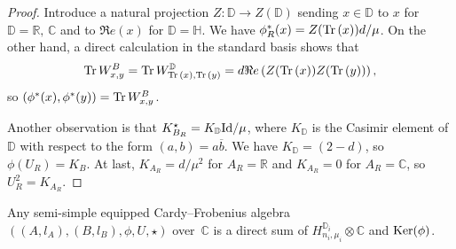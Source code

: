 \documentclass[pdftex]{sigma}
\newcommand{\tr}{\mathop{\sf tr}\nolimits}
\def \R {{\mathbb R}}
\def \C {{\mathbb C}}
\def \H {{\mathbb H}}
\def \tr {{\rm Tr}\,}
\def \id {{\rm Id}}
\def \re {{\Re e}}
\begin{document}
\begin{proof}
Introduce a natural projection $Z: {\mathbb D} \to Z({\mathbb D})$ sending
$x \in \mathbb D$ to $x$ for
${\mathbb D}  = \R,\,\C$ and to $\re (x)$ for ${\mathbb D} =\H$.
We have $\phi^*_R (x) = Z(\tr(x)) d /\mu$. On the other
hand,
a direct calculation in the standard basis shows that
\[
\tr W^B_{x,y} = \tr W^{\mathbb D}_{\tr(x), \tr (y)} = d \re\left(
Z(\tr(x)) Z(\tr(y))\right),
\]
so $(\phi^* (x),
\phi^* (y)) = \tr W^B_{x,y}$.

Another observation is that
 $K_{B_R}^\star =K_\mathbb{D}  \id/\mu$, where  $K_\mathbb{D}$ is the
Casimir element of $\mathbb D$ with respect to the form $(a,b) =
a\overline{b}$. We have $K_\mathbb{D} = (2-d)$, so $\phi(U_R) = K_B$.
At last, $K_{A_R} = d/\mu^2$ for $A_R=\R$ and $K_{A_R} = 0$ for $A_R=\C$, so $U_R^2 = K_{A_R}$.
\end{proof}

\begin{theorem}\label{thc} Any semi-simple equipped
Cardy--Frobenius algebra
$((A,l_A), (B,l_B), \phi, U, \star)$
over~$\mathbb{C}$ is a direct sum of $H^{\mathbb{D}_i}_{n_i,\mu_i} \otimes \C$ and
${\rm Ker} (\phi)$.
\end{theorem}
\end{document}
